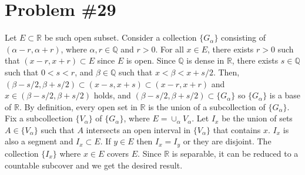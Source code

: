 \documentclass{scrartcl}
\begin{document}
\section{Problem \#29}
Let \(E \subset \mathbb{R}\) be such open subset.
Consider a collection \(\{G_\alpha\}\) consisting of \((\alpha - r, \alpha + r)\), where \(\alpha, r \in \mathbb{Q}\) and \(r > 0\).
For all \(x \in E\), there exists \(r > 0\) such that \((x - r, x + r) \subset E\) since \(E\) is open.
Since \(\mathbb{Q}\) is dense in \(\mathbb{R}\), there exists \(s \in \mathbb{Q}\) such that \(0 < s < r\), and \(\beta \in \mathbb{Q}\) such that \(x < \beta < x + s / 2\).
Then, \((\beta - s / 2, \beta + s / 2) \subset (x - s, x + s) \subset (x - r, x + r)\) and \(x \in (\beta - s / 2, \beta + s / 2)\) holds, and \((\beta - s / 2, \beta + s / 2) \subset \{G_\alpha\}\) so \(\{G_\alpha\}\) is a base of \(\mathbb{R}\).
By definition, every open set in \(\mathbb{R}\) is the union of a subcollection of \(\{G_\alpha\}\).
Fix a subcollection \(\{V_\alpha\}\) of \(\{G_\alpha\}\), where \(E = \cup_\alpha V_\alpha\).
Let \(I_x\) be the union of sets \(A \in \{V_\alpha\}\) such that \(A\) intersects an open interval in \(\{V_\alpha\}\) that contains \(x\).
\(I_x\) is also a segment and \(I_x \subset E\).
If \(y \in E\) then \(I_x = I_y\) or they are disjoint.
The collection \(\{I_x\}\) where \(x \in E\) covers \(E\).
Since \(\mathbb{R}\) is separable, it can be reduced to a countable subcover and we get the desired result.
\end{document}
